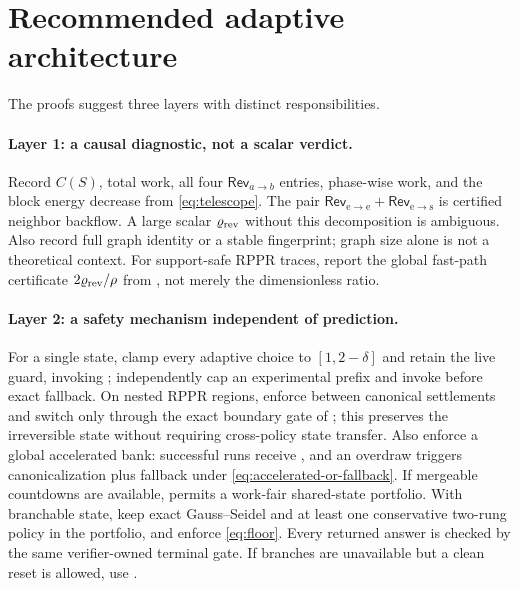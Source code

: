 \section{Recommended adaptive architecture}
\label{sec:architecture}

The proofs suggest three layers with distinct responsibilities.

\paragraph{Layer 1: a causal diagnostic, not a scalar verdict.}
Record $C(S)$, total work, all four $\mathsf{Rev}_{a\to b}$ entries,
phase-wise work,
and the block energy decrease from \eqref{eq:telescope}.  The pair
$\mathsf{Rev}_{\mathrm e\to\mathrm e}
 +\mathsf{Rev}_{\mathrm e\to\mathrm s}$ is certified
neighbor backflow.  A large scalar $\varrho_{\rm rev}$ without this
decomposition is ambiguous.  Also record full graph identity or a stable
fingerprint; graph size alone is not a theoretical context.
For support-safe RPPR traces, report the global fast-path certificate
$2\varrho_{\rm rev}/\rho$ from , not merely the
dimensionless ratio.

\paragraph{Layer 2: a safety mechanism independent of prediction.}
For a single state, clamp every adaptive choice to $[1,2-\delta]$ and retain
the live guard, invoking ; independently cap an
experimental prefix and invoke  before exact
fallback.  On nested RPPR regions, enforce  between
canonical settlements and switch only through the exact boundary gate of
; this preserves the irreversible state
without requiring cross-policy state transfer.  Also enforce a global
accelerated bank: successful runs receive , and an
overdraw triggers canonicalization plus fallback under
\eqref{eq:accelerated-or-fallback}.  If mergeable countdowns are available,
 permits a work-fair shared-state portfolio.
With branchable state,
keep exact Gauss--Seidel and at least one conservative two-rung policy in the
portfolio, and enforce \eqref{eq:floor}.  Every returned answer is checked by
the same verifier-owned terminal gate.  If branches are unavailable but a
clean reset is allowed, use .

